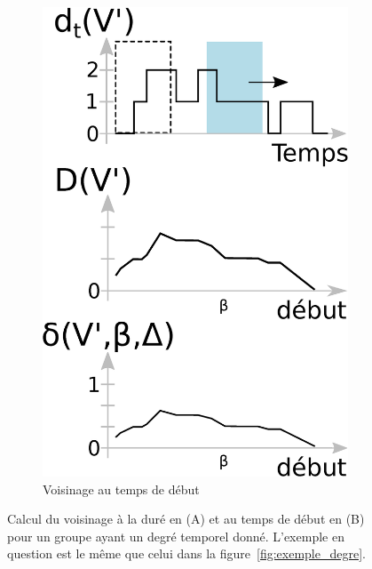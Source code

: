 \begin{figure}
\begin{subfigure}{0.4\textwidth}
		\includegraphics[width=\linewidth]{img/GroupeDense/start_time.eps}
		\caption{Voisinage au temps de début}
		\label{fig:calcul_var_debut.}
	\end{subfigure}\hspace*{0.05cm}

	\caption{Calcul du voisinage à la duré en (A) et au temps de début en (B) pour un groupe ayant un degré temporel donné. L'exemple en question est le même que celui dans la figure~\ref{fig:exemple_degre}.}
	\label{fig:calcul_var_dure_debut.}
\end{figure}

